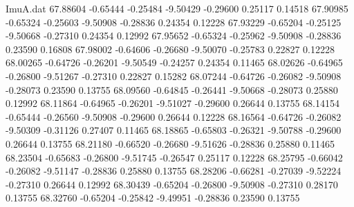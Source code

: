 \begin{filecontents}{ImuA.dat}
  67.88604   -0.65444   -0.25484   -9.50429   -0.29600    0.25117    0.14518
  67.90985   -0.65324   -0.25603   -9.50908   -0.28836    0.24354    0.12228
  67.93229   -0.65204   -0.25125   -9.50668   -0.27310    0.24354    0.12992
  67.95652   -0.65324   -0.25962   -9.50908   -0.28836    0.23590    0.16808
  67.98002   -0.64606   -0.26680   -9.50070   -0.25783    0.22827    0.12228
  68.00265   -0.64726   -0.26201   -9.50549   -0.24257    0.24354    0.11465
  68.02626   -0.64965   -0.26800   -9.51267   -0.27310    0.22827    0.15282
  68.07244   -0.64726   -0.26082   -9.50908   -0.28073    0.23590    0.13755
  68.09560   -0.64845   -0.26441   -9.50668   -0.28073    0.25880    0.12992
  68.11864   -0.64965   -0.26201   -9.51027   -0.29600    0.26644    0.13755
  68.14154   -0.65444   -0.26560   -9.50908   -0.29600    0.26644    0.12228
  68.16564   -0.64726   -0.26082   -9.50309   -0.31126    0.27407    0.11465
  68.18865   -0.65803   -0.26321   -9.50788   -0.29600    0.26644    0.13755
  68.21180   -0.66520   -0.26680   -9.51626   -0.28836    0.25880    0.11465
  68.23504   -0.65683   -0.26800   -9.51745   -0.26547    0.25117    0.12228
  68.25795   -0.66042   -0.26082   -9.51147   -0.28836    0.25880    0.13755
  68.28206   -0.66281   -0.27039   -9.52224   -0.27310    0.26644    0.12992
  68.30439   -0.65204   -0.26800   -9.50908   -0.27310    0.28170    0.13755
  68.32760   -0.65204   -0.25842   -9.49951   -0.28836    0.23590    0.13755
\end{filecontents}
